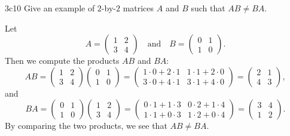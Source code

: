 \begin{exercise}{3c10}
    Give an example of $2$-by-$2$ matrices $A$ and $B$ such that $AB \neq BA$.
\end{exercise}

\begin{sol}
    Let 
    \[
        A =
        \begin{pmatrix}
            1 & 2 \\
            3 & 4
        \end{pmatrix} \quad \text{and} \quad B = 
        \begin{pmatrix}
            0 & 1 \\
            1 & 0
        \end{pmatrix}.
    \]
    Then we compute the products $AB$ and $BA$:
    \[
        AB = 
        \begin{pmatrix}
            1 & 2 \\
            3 & 4
        \end{pmatrix} 
        \begin{pmatrix}
            0 & 1 \\
            1 & 0
        \end{pmatrix} 
        = 
        \begin{pmatrix}
            1 \cdot 0 + 2 \cdot 1 & 1 \cdot 1 + 2 \cdot 0 \\
            3 \cdot 0 + 4 \cdot 1 & 3 \cdot 1 + 4 \cdot 0
        \end{pmatrix} 
        = 
        \begin{pmatrix}
            2 & 1 \\
            4 & 3
        \end{pmatrix},
    \]
    and
    \[
        BA = 
        \begin{pmatrix}
            0 & 1 \\
            1 & 0
        \end{pmatrix} 
        \begin{pmatrix}
            1 & 2 \\
            3 & 4
        \end{pmatrix} 
        = 
        \begin{pmatrix}
            0 \cdot 1 + 1 \cdot 3 & 0 \cdot 2 + 1 \cdot 4 \\
            1 \cdot 1 + 0 \cdot 3 & 1 \cdot 2 + 0 \cdot 4
        \end{pmatrix} 
        = 
        \begin{pmatrix}
            3 & 4 \\
            1 & 2
        \end{pmatrix}.
    \]
    By comparing the two products, we see that $AB \neq BA$.
\end{sol}

